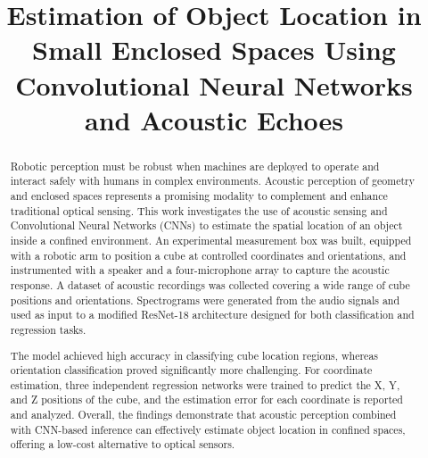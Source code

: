 \documentclass[conference]{IEEEtran}
\begin{document}
%
\title{Estimation of Object Location in Small Enclosed Spaces Using Convolutional Neural Networks and Acoustic Echoes}


\author{
\and
{}

}


\maketitle

\begin{abstract}
Robotic perception must be robust when machines are deployed to operate and interact safely with humans in complex environments. Acoustic perception of geometry and enclosed spaces represents a promising modality to complement and enhance traditional optical sensing. This work investigates the use of acoustic sensing and Convolutional Neural Networks (CNNs) to estimate the spatial location of an object inside a confined environment. An experimental measurement box was built, equipped with a robotic arm to position a cube at controlled coordinates and orientations, and instrumented with a speaker and a four-microphone array to capture the acoustic response. A dataset of acoustic recordings was collected covering a wide range of cube positions and orientations. Spectrograms were generated from the audio signals and used as input to a modified ResNet-18 architecture designed for both classification and regression tasks.

The model achieved high accuracy in classifying cube location regions, whereas orientation classification proved significantly more challenging. For coordinate estimation, three independent regression networks were trained to predict the X, Y, and Z positions of the cube, and the estimation error for each coordinate is reported and analyzed. Overall, the findings demonstrate that acoustic perception combined with CNN-based inference can effectively estimate object location in confined spaces, offering a low-cost alternative to optical sensors.

\end{abstract}
\end{document}
